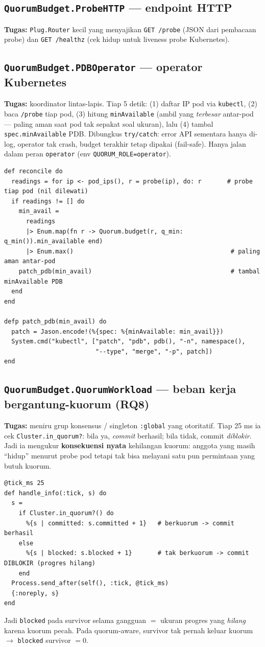 \documentclass[11pt]{article}
\newcommand{\code}[1]{\texttt{\small #1}}
\begin{document}
\subsection{\texttt{QuorumBudget.ProbeHTTP} --- endpoint HTTP}
\textbf{Tugas:} \code{Plug.Router} kecil yang menyajikan \code{GET /probe} (JSON dari pembacaan probe)
dan \code{GET /healthz} (cek hidup untuk liveness probe Kubernetes).

\subsection{\texttt{QuorumBudget.PDBOperator} --- operator Kubernetes}
\label{sec:mod-operator}
\textbf{Tugas:} koordinator lintas-lapis. Tiap 5 detik: (1) daftar IP pod via \code{kubectl}, (2) baca
\code{/probe} tiap pod, (3) hitung \code{minAvailable} (ambil yang \emph{terbesar} antar-pod --- paling
aman saat pod tak sepakat soal ukuran), lalu (4) tambal \code{spec.minAvailable} PDB. Dibungkus
\code{try/catch}: error API sementara hanya di-log, operator tak crash, budget terakhir tetap dipakai
(fail-safe). Hanya jalan dalam peran \code{operator} (env \code{QUORUM\_ROLE=operator}).
\begin{lstlisting}[style=ex]
def reconcile do
  readings = for ip <- pod_ips(), r = probe(ip), do: r       # probe tiap pod (nil dilewati)
  if readings != [] do
    min_avail =
      readings
      |> Enum.map(fn r -> Quorum.budget(r, q_min: q_min()).min_available end)
      |> Enum.max()                                           # paling aman antar-pod
    patch_pdb(min_avail)                                      # tambal minAvailable PDB
  end
end

defp patch_pdb(min_avail) do
  patch = Jason.encode!(%{spec: %{minAvailable: min_avail}})
  System.cmd("kubectl", ["patch", "pdb", pdb(), "-n", namespace(),
                         "--type", "merge", "-p", patch])
end
\end{lstlisting}

\subsection{\texttt{QuorumBudget.QuorumWorkload} --- beban kerja bergantung-kuorum (RQ8)}
\label{sec:mod-workload}
\textbf{Tugas:} meniru grup konsensus / singleton \code{:global} yang otoritatif. Tiap 25 ms ia cek
\code{Cluster.in\_quorum?}: bila ya, \emph{commit} berhasil; bila tidak, commit \emph{diblokir}. Jadi
ia mengukur \textbf{konsekuensi nyata} kehilangan kuorum: anggota yang masih ``hidup'' menurut probe
pod tetapi tak bisa melayani satu pun permintaan yang butuh kuorum.
\begin{lstlisting}[style=ex]
@tick_ms 25
def handle_info(:tick, s) do
  s =
    if Cluster.in_quorum?() do
      %{s | committed: s.committed + 1}   # berkuorum -> commit berhasil
    else
      %{s | blocked: s.blocked + 1}       # tak berkuorum -> commit DIBLOKIR (progres hilang)
    end
  Process.send_after(self(), :tick, @tick_ms)
  {:noreply, s}
end
\end{lstlisting}
Jadi \code{blocked} pada survivor selama gangguan $=$ ukuran progres yang \emph{hilang} karena kuorum
pecah. Pada quorum-aware, survivor tak pernah keluar kuorum $\rightarrow$ \code{blocked} survivor $=0$.
\end{document}
